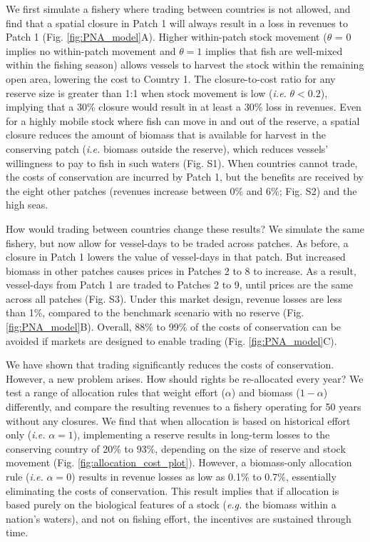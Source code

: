 \documentclass[12pt]{article}
\begin{document}
We first simulate a fishery where trading between countries is not allowed, and find that a spatial closure in Patch 1 will always result in a loss in revenues to Patch 1 (Fig. \ref{fig:PNA_model}A). Higher within-patch stock movement ($\theta$ = 0 implies no within-patch movement and $\theta = 1$ implies that fish are well-mixed within the fishing season) allows vessels to harvest the stock within the remaining open area, lowering the cost to Country 1. The closure-to-cost ratio for any reserve size is greater than 1:1 when stock movement is low (\emph{i.e.} $\theta < 0.2$), implying that a 30\% closure would result in at least a 30\% loss in revenues. Even for a highly mobile stock where fish can move in and out of the reserve, a spatial closure reduces the amount of biomass that is available for harvest in the conserving patch (\emph{i.e.} biomass outside the reserve), which reduces vessels' willingness to pay to fish in such waters (Fig. S1). When countries cannot trade, the costs of conservation are incurred by Patch 1, but the benefits are received by the eight other patches (revenues increase between 0\% and 6\%; Fig. S2) and the high seas.

How would trading between countries change these results? We simulate the same fishery, but now allow for vessel-days to be traded across patches. As before, a closure in Patch 1 lowers the value of vessel-days in that patch. But increased biomass in other patches causes prices in Patches 2 to 8 to increase. As a result, vessel-days from Patch 1 are traded to Patches 2 to 9, until prices are the same across all patches (Fig. S3). Under this market design, revenue losses are less than 1\%, compared to the benchmark scenario with no reserve (Fig. \ref{fig:PNA_model}B). Overall, 88\% to 99\% of the costs of conservation can be avoided if markets are designed to enable trading (Fig. \ref{fig:PNA_model}C).

We have shown that trading significantly reduces the costs of conservation. However, a new problem arises. How should rights be re-allocated every year? We test a range of allocation rules that weight effort ($\alpha$) and biomass ($1 - \alpha$) differently, and compare the resulting revenues to a fishery operating for 50 years without any closures. We find that when allocation is based on historical effort only (\emph{i.e.} $\alpha = 1$), implementing a reserve results in long-term losses to the conserving country of 20\% to 93\%, depending on the size of reserve and stock movement (Fig. \ref{fig:allocation_cost_plot}). However, a biomass-only allocation rule (\emph{i.e.} $\alpha = 0$) results in revenue losses as low as 0.1\% to 0.7\%, essentially eliminating the costs of conservation. This result implies that if allocation is based purely on the biological features of a stock (\emph{e.g.} the biomass within a nation's waters), and not on fishing effort, the incentives are sustained through time. 
\end{document}
